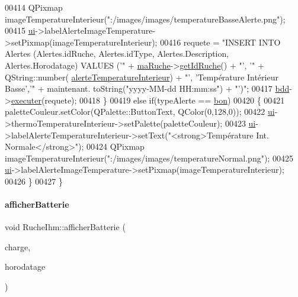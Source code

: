 \begin{DoxyCode}
00414         QPixmap imageTemperatureInterieur(\textcolor{stringliteral}{":/images/images/temperatureBasseAlerte.png"});
00415         \hyperlink{class_ruche_ihm_a64786058bd7f88ca2f1e9743bb27c25b}{ui}->labelAlerteImageTemperature->setPixmap(imageTemperatureInterieur);
00416         requete = \textcolor{stringliteral}{"INSERT INTO Alertes (Alertes.idRuche, Alertes.idType, Alertes.Description,
       Alertes.Horodatage) VALUES ('"} + \hyperlink{class_ruche_ihm_a43a6b1fa31f4fba58d919daae3707b38}{maRuche}->\hyperlink{class_ruche_a9f2de5ef29557ec7a53d5e22df34d164}{getIdRuche}() + \textcolor{stringliteral}{"', '"} + QString::number(
      \hyperlink{parametres_8h_a83a725fd153179a2bd97afcc8307737ba6d07a737b602e59b2350e913e4763724}{alerteTemperatureInterieur}) + \textcolor{stringliteral}{"', 'Température Intérieur Basse','"} + maintenant.
      toString(\textcolor{stringliteral}{"yyyy-MM-dd  HH:mm:ss"}) + \textcolor{stringliteral}{"')"};
00417         \hyperlink{class_ruche_ihm_a0851936fe212e8d40538264f09749153}{bdd}->\hyperlink{class_base_de_donnees_aa8de5f8f8bb17edc43f5c0ee33712081}{executer}(requete);
00418      \}
00419      \textcolor{keywordflow}{else} \textcolor{keywordflow}{if}(typeAlerte == \hyperlink{parametres_8h_aaa6de8207c94675264c90b10b613368da5ac8ec3b54d90a07c6bb5a77ef971821}{bon})
00420      \{
00421         paletteCouleur.setColor(QPalette::ButtonText, QColor(0,128,0));
00422         \hyperlink{class_ruche_ihm_a64786058bd7f88ca2f1e9743bb27c25b}{ui}->thermoTemperatureInterieur->setPalette(paletteCouleur);
00423         \hyperlink{class_ruche_ihm_a64786058bd7f88ca2f1e9743bb27c25b}{ui}->labelAlerteTemperatureInterieur->setText(\textcolor{stringliteral}{"<strong>Température Int. Normale</strong>"});
00424         QPixmap imageTemperatureInterieur(\textcolor{stringliteral}{":/images/images/temperatureNormal.png"});
00425         \hyperlink{class_ruche_ihm_a64786058bd7f88ca2f1e9743bb27c25b}{ui}->labelAlerteImageTemperature->setPixmap(imageTemperatureInterieur);
00426      \}
00427 \}
\end{DoxyCode}
\mbox{\label{class_ruche_ihm_a3934082a49b22f4c6096d96887a11591}} 
\paragraph{\texorpdfstring{afficher\+Batterie}{afficherBatterie}}
{\footnotesize\ttfamily void Ruche\+Ihm\+::afficher\+Batterie (\begin{DoxyParamCaption}\item[{double}]{charge,  }\item[{Q\+String}]{horodatage }\end{DoxyParamCaption})\hspace{0.3cm}{\ttfamily [slot]}}



